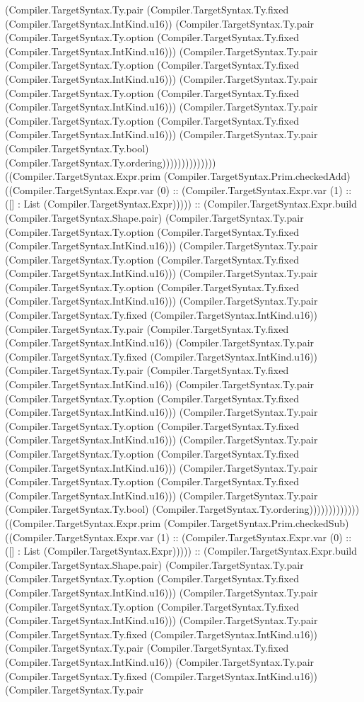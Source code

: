 \documentclass[11pt]{article}
\begin{document}
(Compiler.TargetSyntax.Ty.pair (Compiler.TargetSyntax.Ty.fixed (Compiler.TargetSyntax.IntKind.u16)) (Compiler.TargetSyntax.Ty.pair (Compiler.TargetSyntax.Ty.option (Compiler.TargetSyntax.Ty.fixed (Compiler.TargetSyntax.IntKind.u16))) (Compiler.TargetSyntax.Ty.pair (Compiler.TargetSyntax.Ty.option (Compiler.TargetSyntax.Ty.fixed (Compiler.TargetSyntax.IntKind.u16))) (Compiler.TargetSyntax.Ty.pair (Compiler.TargetSyntax.Ty.option (Compiler.TargetSyntax.Ty.fixed (Compiler.TargetSyntax.IntKind.u16))) (Compiler.TargetSyntax.Ty.pair (Compiler.TargetSyntax.Ty.option (Compiler.TargetSyntax.Ty.fixed (Compiler.TargetSyntax.IntKind.u16))) (Compiler.TargetSyntax.Ty.pair (Compiler.TargetSyntax.Ty.bool) (Compiler.TargetSyntax.Ty.ordering)))))))))))))) ((Compiler.TargetSyntax.Expr.prim (Compiler.TargetSyntax.Prim.checkedAdd) ((Compiler.TargetSyntax.Expr.var (0) :: (Compiler.TargetSyntax.Expr.var (1) :: ([] : List (Compiler.TargetSyntax.Expr))))) :: (Compiler.TargetSyntax.Expr.build (Compiler.TargetSyntax.Shape.pair) (Compiler.TargetSyntax.Ty.pair (Compiler.TargetSyntax.Ty.option (Compiler.TargetSyntax.Ty.fixed (Compiler.TargetSyntax.IntKind.u16))) (Compiler.TargetSyntax.Ty.pair (Compiler.TargetSyntax.Ty.option (Compiler.TargetSyntax.Ty.fixed (Compiler.TargetSyntax.IntKind.u16))) (Compiler.TargetSyntax.Ty.pair (Compiler.TargetSyntax.Ty.option (Compiler.TargetSyntax.Ty.fixed (Compiler.TargetSyntax.IntKind.u16))) (Compiler.TargetSyntax.Ty.pair (Compiler.TargetSyntax.Ty.fixed (Compiler.TargetSyntax.IntKind.u16)) (Compiler.TargetSyntax.Ty.pair (Compiler.TargetSyntax.Ty.fixed (Compiler.TargetSyntax.IntKind.u16)) (Compiler.TargetSyntax.Ty.pair (Compiler.TargetSyntax.Ty.fixed (Compiler.TargetSyntax.IntKind.u16)) (Compiler.TargetSyntax.Ty.pair (Compiler.TargetSyntax.Ty.fixed (Compiler.TargetSyntax.IntKind.u16)) (Compiler.TargetSyntax.Ty.pair (Compiler.TargetSyntax.Ty.option (Compiler.TargetSyntax.Ty.fixed (Compiler.TargetSyntax.IntKind.u16))) (Compiler.TargetSyntax.Ty.pair (Compiler.TargetSyntax.Ty.option (Compiler.TargetSyntax.Ty.fixed (Compiler.TargetSyntax.IntKind.u16))) (Compiler.TargetSyntax.Ty.pair (Compiler.TargetSyntax.Ty.option (Compiler.TargetSyntax.Ty.fixed (Compiler.TargetSyntax.IntKind.u16))) (Compiler.TargetSyntax.Ty.pair (Compiler.TargetSyntax.Ty.option (Compiler.TargetSyntax.Ty.fixed (Compiler.TargetSyntax.IntKind.u16))) (Compiler.TargetSyntax.Ty.pair (Compiler.TargetSyntax.Ty.bool) (Compiler.TargetSyntax.Ty.ordering))))))))))))) ((Compiler.TargetSyntax.Expr.prim (Compiler.TargetSyntax.Prim.checkedSub) ((Compiler.TargetSyntax.Expr.var (1) :: (Compiler.TargetSyntax.Expr.var (0) :: ([] : List (Compiler.TargetSyntax.Expr))))) :: (Compiler.TargetSyntax.Expr.build (Compiler.TargetSyntax.Shape.pair) (Compiler.TargetSyntax.Ty.pair (Compiler.TargetSyntax.Ty.option (Compiler.TargetSyntax.Ty.fixed (Compiler.TargetSyntax.IntKind.u16))) (Compiler.TargetSyntax.Ty.pair (Compiler.TargetSyntax.Ty.option (Compiler.TargetSyntax.Ty.fixed (Compiler.TargetSyntax.IntKind.u16))) (Compiler.TargetSyntax.Ty.pair (Compiler.TargetSyntax.Ty.fixed (Compiler.TargetSyntax.IntKind.u16)) (Compiler.TargetSyntax.Ty.pair (Compiler.TargetSyntax.Ty.fixed (Compiler.TargetSyntax.IntKind.u16)) (Compiler.TargetSyntax.Ty.pair (Compiler.TargetSyntax.Ty.fixed (Compiler.TargetSyntax.IntKind.u16)) (Compiler.TargetSyntax.Ty.pair 
\end{document}
